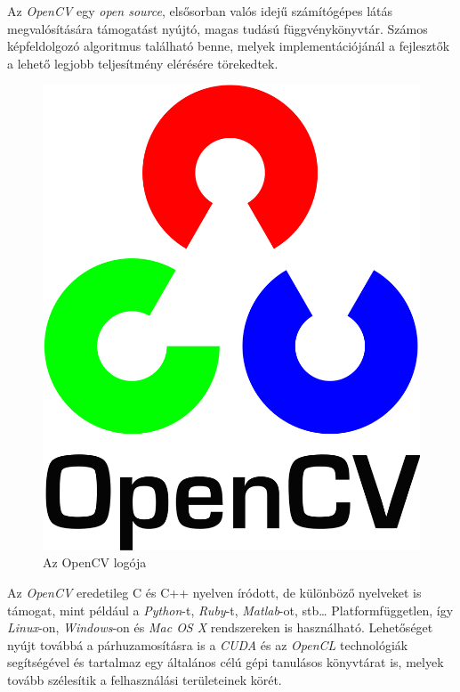 



Az \textit{OpenCV} egy \textit{open source}, elsősorban valós idejű számítógépes látás megvalósítására támogatást nyújtó, magas tudású függvénykönyvtár. Számos képfeldolgozó algoritmus található benne, melyek implementációjánál a fejlesztők a lehető legjobb teljesítmény elérésére törekedtek.

\begin{figure}[h]
\centering
\includegraphics[width=2.4truecm, height=2.96truecm]{images/OpenCV-logo.png}
\caption{Az OpenCV logója}
\label{fig:opencv}
\end{figure}

Az \textit{OpenCV} eredetileg C és C++ nyelven íródott, de különböző nyelveket is támogat, mint például a \textit{Python}-t, \textit{Ruby}-t, \textit{Matlab}-ot, stb\ldots
Platformfüggetlen, így \textit{Linux}-on, \textit{Windows}-on és \textit{Mac OS X} rendszereken is használható. Lehetőséget nyújt továbbá a párhuzamosításra is a \textit{CUDA} és az \textit{OpenCL} technológiák segítségével és tartalmaz egy általános célú gépi tanulásos könyvtárat is, melyek tovább szélesítik a felhasználási területeinek körét. \cite{bradski2008learning}

